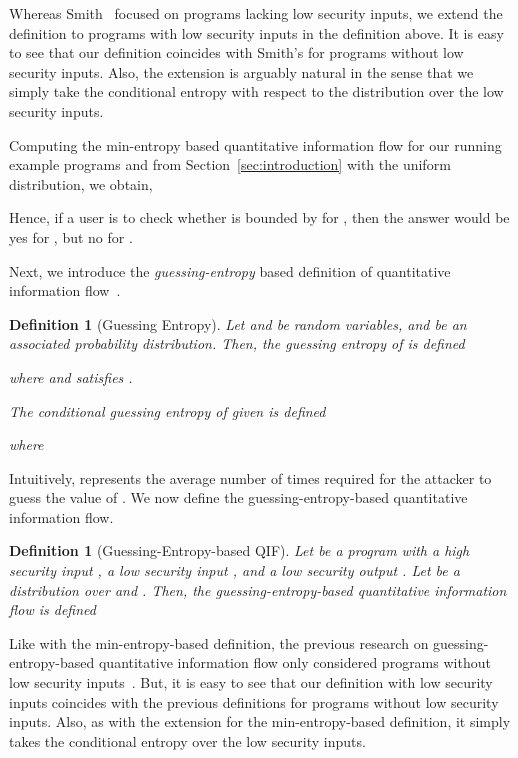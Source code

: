 \documentclass{llncs}
\newtheorem{definition}[theorem]{Definition}
\begin{document}
Whereas Smith~\cite{smith09} focused on programs lacking low security
inputs, we extend the definition to programs with low security inputs
in the definition above.  It is easy to see that our definition
coincides with Smith's for programs without low security
inputs.  Also, the extension is arguably natural in the sense that we simply
take the conditional entropy with respect to the distribution over the
low security inputs.

Computing the min-entropy based quantitative information flow for our
running example programs  and  from
Section~\ref{sec:introduction} with the uniform distribution, we
obtain,

Hence, if a user is to check whether  is bounded by 
for , then the answer would be yes for , but no for
.

Next, we introduce the {\em guessing-entropy} based definition of
quantitative information
flow~\cite{Massey94,kopf07,DBLP:conf/sp/BackesKR09}.
\begin{definition}[Guessing Entropy]
Let  and  be random variables, and  be an associated probability
distribution.  Then, the guessing entropy of  is defined

where  and  satisfies .

The conditional guessing entropy of  given  is defined

where

\end{definition}

Intuitively,  represents the average number of
times required for the attacker to guess the value of .  We now
define the guessing-entropy-based quantitative information flow.

\begin{definition}[Guessing-Entropy-based QIF]
\label{def:ge}
Let  be a program with a high security input , a low security input
, and a low security output .  Let  be a distribution over
 and .  Then, the guessing-entropy-based quantitative
information flow is defined

\end{definition}

\begin{sloppypar}
Like with the min-entropy-based definition, the previous research on
guessing-entropy-based quantitative information flow only considered
programs without low security
inputs~\cite{kopf07,DBLP:conf/sp/BackesKR09}.  But, it is easy to see
that our definition with low security inputs coincides with the
previous definitions for programs without low security inputs.  Also,
as with the extension for the min-entropy-based definition, it simply
takes the conditional entropy over the low security inputs.
\end{sloppypar}
\end{document}
